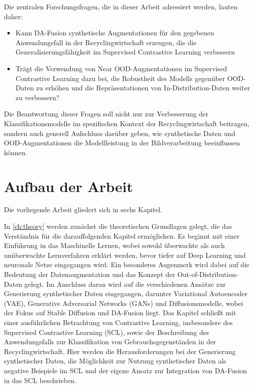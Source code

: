 Die zentralen Forschungsfragen, die in dieser Arbeit adressiert werden, lauten daher:

\begin{itemize}
    \item Kann DA-Fusion synthetische Augmentationen für den gegebenen Anwendungsfall in der Recyclingwirtschaft erzeugen, die die Generalisierungsfähigkeit im Supervised Contrastive Learning verbessern
    \item Trägt die Verwendung von Near OOD-Augmentationen im Supervised Contrastive Learning dazu bei, die Robustheit des Modells gegenüber OOD-Daten zu erhöhen und die Repräsentationen von In-Distribution-Daten weiter zu verbessern?
\end{itemize}

Die Beantwortung dieser Fragen soll nicht nur zur Verbesserung der Klassifikationsmodelle im spezifischen Kontext der Recyclingwirtschaft beitragen, sondern auch generell Aufschluss darüber geben, wie synthetische Daten und OOD-Augmentationen die Modellleistung in der Bildverarbeitung beeinflussen können.

\section{Aufbau der Arbeit} \label{sec:structure}

Die vorliegende Arbeit gliedert sich in sechs Kapitel. 

In \autoref{ch:theory} werden zunächst die theoretischen Grundlagen gelegt, die das Verständnis für die darauffolgenden Kapitel ermöglichen. Es beginnt mit einer Einführung in das Maschinelle Lernen, wobei sowohl überwachte als auch unüberwachte Lernverfahren erklärt werden, bevor tiefer auf Deep Learning und neuronale Netze eingegangen wird. Ein besonderes Augenmerk wird dabei auf die Bedeutung der Datenaugmentation und das Konzept der Out-of-Distribution-Daten gelegt. Im Anschluss daran wird auf die verschiedenen Ansätze zur Generierung synthetischer Daten eingegangen, darunter Variational Autoencoder (VAE), Generative Adversarial Networks (GANs) und Diffusionsmodelle, wobei der Fokus auf Stable Diffusion und DA-Fusion liegt. Das Kapitel schließt mit einer ausführlichen Betrachtung von Contrastive Learning, insbesondere des Supervised Contrastive Learning (SCL), sowie der Beschreibung des Anwendungsfalls zur Klassifikation von Gebrauchsgegenständen in der Recyclingwirtschaft. Hier werden die Herausforderungen bei der Generierung synthetischer Daten, die Möglichkeit zur Nutzung synthetischer Daten als negative Beispiele im SCL und der eigene Ansatz zur Integration von DA-Fusion in das SCL beschrieben.

